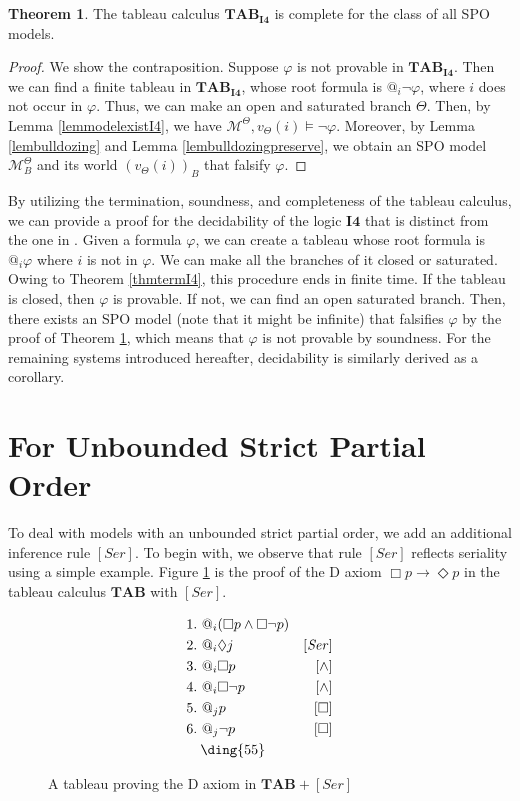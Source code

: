 \documentclass{article}
\theoremstyle{definition}
\newtheorem{theorem}[definition]{Theorem}
\newcommand{\Dia}{\Diamond}
\newcommand{\Kmodel}{\mathcal{M}}
\newcommand{\tableau}{\mathbf{TAB}}
\newcommand{\ser}{\mathit{Ser}}
\newcommand{\tableauIF}{\mathbf{TAB}_{\mathbf{I4}}}
\begin{document}
\begin{theorem}
    The tableau calculus $\tableauIF$ is complete for the class of all SPO models.
    \label{thmcompleteI4}
\end{theorem}
\begin{proof}
    We show the contraposition. Suppose $\varphi$ is not provable in $\tableauIF$. Then we can find a finite tableau in $\tableauIF$, whose root formula is $@_i \neg \varphi$, where $i$ does not occur in $\varphi$. Thus, we can make an open and saturated branch $\Theta$. Then, by Lemma \ref{lemmodelexistI4}, we have $\Kmodel^\Theta, v_\Theta(i) \models \neg \varphi$. Moreover, by Lemma \ref{lembulldozing} and Lemma \ref{lembulldozingpreserve}, we obtain an SPO model $\Kmodel^\Theta_B$ and its world $(v_\Theta(i))_B$ that falsify $\varphi$. 
\end{proof}

By utilizing the termination, soundness, and completeness of the tableau calculus, we can provide a proof for the decidability of the logic $\mathbf{I4}$ that is distinct from the one in \cite{blackburn1993}.
Given a formula $\varphi$, we can create a tableau whose root formula is $@_i \varphi$ where $i$ is not in $\varphi$.
We can make all the branches of it closed or saturated.
Owing to Theorem \ref{thmtermI4}, this procedure ends in finite time. If the tableau is closed, then $\varphi$ is provable.
If not, we can find an open saturated branch.
Then, there exists an SPO model (note that it might be infinite) that falsifies $\varphi$ by the proof of Theorem \ref{thmcompleteI4}, which means that $\varphi$ is not provable by soundness.
For the remaining systems introduced hereafter, decidability is similarly derived as a corollary.

\section{For Unbounded Strict Partial Order}
\label{secUSPO}

To deal with models with an unbounded strict partial order, we add an additional inference rule $[\ser]$. To begin with, we observe that rule $[\ser]$ reflects seriality using a simple example. Figure \ref{figtabserial} is the proof of the D axiom $\Box p \rightarrow \Dia p$ in the tableau calculus $\tableau$ with $[\ser]$.

\begin{figure}[tbp]
  \begin{align*}
    &1. \ @_i (\Box p \land \Box \neg p) & \\
    &2. \ @_i \Dia j &[\ser] \\
    &3. \ @_i \Box p &[\land] \\
    &4. \ @_i \Box \neg p &[\land] \\
    &5. \ @_j p &[\Box] \\
    &6. \ @_j \neg p &[\Box] \\
    &\quad \text{\ding{55}}
  \end{align*}
  \caption{A tableau proving the D axiom in $\tableau + [\ser]$}
  \label{figtabserial}
\end{figure}
\end{document}
